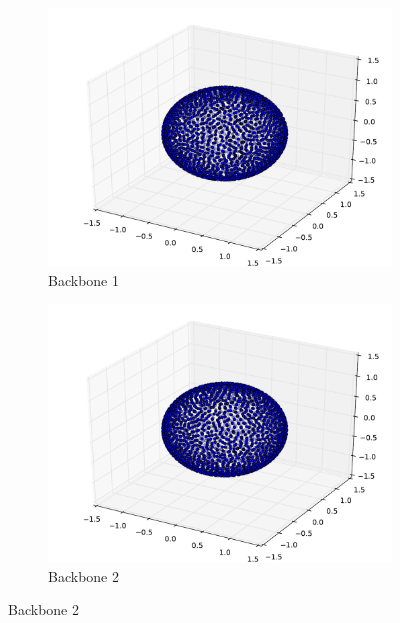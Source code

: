 \documentclass[oneside, titlepage]{scrartcl}
\begin{document}
\begin{figure}[!h]
\begin{subfigure}{0.5\textwidth}
	\centering
	\includegraphics[width=0.9\linewidth]{figures/simplegraph10.pdf}
	\caption{Backbone 1}
\end{subfigure}%
\begin{subfigure}{0.5\textwidth}
	\centering
	\includegraphics[width=0.9\linewidth]{figures/simplegraph101.pdf}
	\caption{Backbone 2}
\end{subfigure}
\end{figure}
\end{document}
